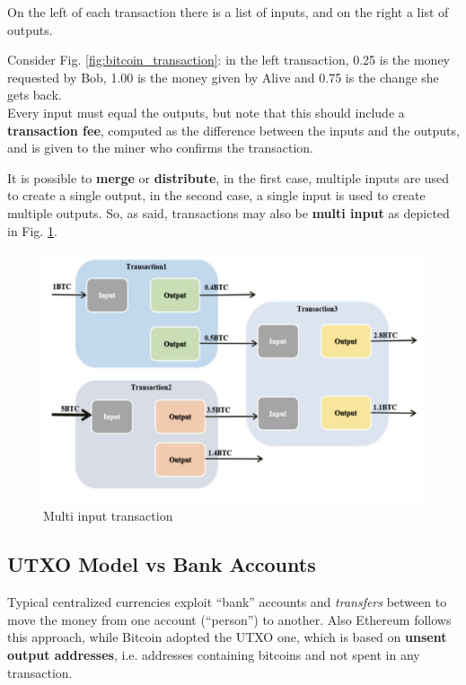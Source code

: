 On the left of each transaction there is a list of inputs, and on the right a list of outputs. 

Consider Fig. \ref{fig:bitcoin_transaction}: in the left transaction, 0.25 is the money requested by Bob, 1.00 is the money given by Alive and 0.75 is the change she gets back.\\
Every input must equal the outputs, but note that this should include a \textbf{transaction fee}, computed as the difference between the inputs and the outputs, and is given to the miner who confirms the transaction.

It is possible to \textbf{merge} or \textbf{distribute}, in the first case, multiple inputs are used to create a single output, in the second case, a single input is used to create multiple outputs.
So, as said, transactions may also be \textbf{multi input} as depicted in Fig. \ref{fig:bitcoin_multiinput}.

\begin{figure}[htbp]
   \centering
   \includegraphics{images/bitcoin_multiinput.png}
   \caption{Multi input transaction}
   \label{fig:bitcoin_multiinput}
\end{figure}

\subsection{UTXO Model vs Bank Accounts}
Typical centralized currencies exploit ``bank'' accounts and \textit{transfers} between to move the money from one account (``person'') to another.
Also Ethereum follows this approach, while Bitcoin adopted the UTXO one, which is based on \textbf{unsent output addresses}, i.e. addresses containing bitcoins and not spent in any
transaction.

